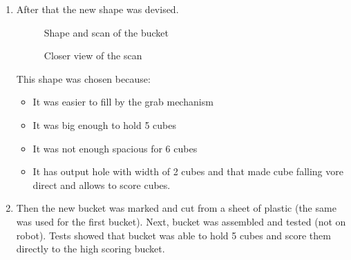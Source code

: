 \begin{enumerate}
  \item After that the new shape was devised. 
  
 \begin{figure}[H]
  \begin{minipage}[h]{0.49\linewidth}
  	\caption{Shape and scan of the bucket}
  \end{minipage} 
  \begin{minipage}[h]{0.49\linewidth}
  	\caption{Closer view of the scan}
  \end{minipage}
 \end{figure}
  
  This shape was chosen because: 
  \begin{itemize}
  	\item It was easier to fill by the grab mechanism
  	\item It was big enough to hold 5 cubes
  	\item It was not enough spacious for 6 cubes
  	\item It has output hole with width of 2 cubes and that made cube falling vore direct and allows to score cubes.  
  \end{itemize}
  \item Then the new bucket was marked and cut from a sheet of plastic (the same was used for the first bucket). Next, bucket was assembled and tested (not on robot). Tests showed that bucket was able to hold 5 cubes and score them directly to the high scoring bucket. 
  

\end{enumerate}
